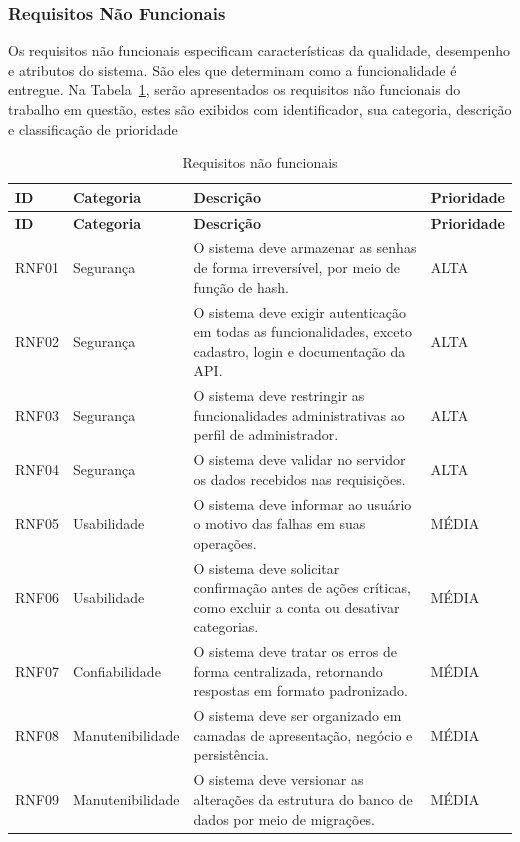 \documentclass[12pt,a4paper]{article}
\begin{document}
\subsubsection{Requisitos Não Funcionais}
Os requisitos não funcionais especificam características da qualidade, desempenho e atributos do sistema. São eles que determinam como a funcionalidade é entregue.
Na Tabela~\ref{tab:requisitos-nao-funcionais}, serão apresentados os requisitos não funcionais do trabalho em questão, estes são exibidos com identificador, sua categoria, descrição e classificação de prioridade

\begin{longtable}{|p{}|p{}|p{}|p{}|}
\caption{Requisitos não funcionais}
\label{tab:requisitos-nao-funcionais} \\
\hline
\textbf{ID} & \textbf{Categoria} & \textbf{Descrição} & \textbf{Prioridade} \\
\hline
\endfirsthead

\hline
\textbf{ID} & \textbf{Categoria} & \textbf{Descrição} & \textbf{Prioridade} \\
\hline
\endhead

\hline
\endfoot

RNF01 & Segurança & O sistema deve armazenar as senhas de forma irreversível, por meio de função de hash. & ALTA \\
\hline
RNF02 & Segurança &O sistema deve exigir autenticação em todas as funcionalidades, exceto cadastro, login e documentação da API. & ALTA \\
\hline
RNF03 & Segurança & O sistema deve restringir as funcionalidades administrativas ao perfil de administrador. & ALTA \\
\hline
RNF04 & Segurança & O sistema deve validar no servidor os dados recebidos nas requisições. & ALTA \\
\hline
RNF05 & Usabilidade & O sistema deve informar ao usuário o motivo das falhas em suas operações. & MÉDIA \\
\hline
RNF06 & Usabilidade & O sistema deve solicitar confirmação antes de ações críticas, como excluir a conta ou desativar categorias. & MÉDIA \\
\hline
RNF07 & Confiabilidade & O sistema deve tratar os erros de forma centralizada, retornando respostas em formato padronizado. & MÉDIA \\
\hline
RNF08 & Manutenibilidade & O sistema deve ser organizado em camadas de apresentação, negócio e persistência. & MÉDIA \\
\hline
RNF09 & Manutenibilidade & O sistema deve versionar as alterações da estrutura do banco de dados por meio de migrações. & MÉDIA \\

\end{longtable}
\end{document}
